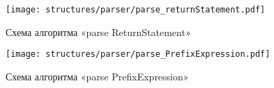 \clearpage

\begin{figure}[!htp]
	\centering
	\texttt{[image: structures/parser/parse\_returnStatement.pdf]}
	\caption{Схема алгоритма «parse ReturnStatement»}
	\label{f:parse_returnStatement}
\end{figure}

\begin{figure}[!htp]
	\centering
	\texttt{[image: structures/parser/parse\_PrefixExpression.pdf]}
	\caption{Схема алгоритма «parse PrefixExpression»}
	\label{f:parse_PrefixExpression}
\end{figure}

\clearpage

